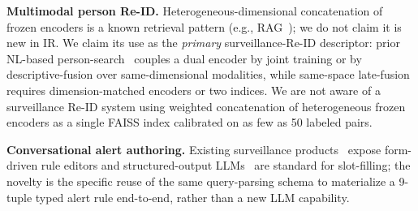 ﻿\documentclass[conference]{IEEEtran}
\theoremstyle{definition}
\begin{document}
\textbf{Multimodal person Re-ID.} Heterogeneous-dimensional concatenation of frozen encoders is a known retrieval pattern (e.g., RAG~\cite{b4}); we do not claim it is new in IR. We claim its use as the \emph{primary} surveillance-Re-ID descriptor: prior NL-based person-search~\cite{b32,b33,b34,b35} couples a dual encoder by joint training or by descriptive-fusion over same-dimensional modalities, while same-space late-fusion~\cite{b27} requires dimension-matched encoders or two indices. We are not aware of a surveillance Re-ID system using weighted concatenation of heterogeneous frozen encoders as a single FAISS index calibrated on as few as 50 labeled pairs.

\textbf{Conversational alert authoring.} Existing surveillance products~\cite{b7,b8,b12} expose form-driven rule editors and structured-output LLMs~\cite{b20} are standard for slot-filling; the novelty is the specific reuse of the same query-parsing schema to materialize a 9-tuple typed alert rule end-to-end, rather than a new LLM capability.
\end{document}
